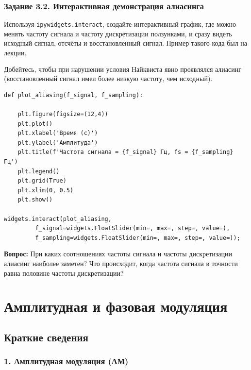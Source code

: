 \documentclass[12pt,a4paper,openany]{book}
\begin{document}
\subsection*{Задание 3.2. Интерактивная демонстрация алиасинга}

Используя \texttt{ipywidgets.\allowbreak{}interact}, создайте интерактивный график, где можно менять частоту сигнала и частоту дискретизации ползунками, и сразу видеть исходный сигнал, отсчёты и восстановленный сигнал. Пример такого кода был на лекции.

Добейтесь, чтобы при нарушении условия Найквиста явно проявлялся алиасинг (восстановленный сигнал имел более низкую частоту, чем исходный).

\begin{Verbatim}[fontsize=\small, breaklines, breakanywhere, frame=single, framesep=2mm]
def plot_aliasing(f_signal, f_sampling):

    plt.figure(figsize=(12,4))
    plt.plot()
    plt.xlabel('Время (с)')
    plt.ylabel('Амплитуда')
    plt.title(f'Частота сигнала = {f_signal} Гц, fs = {f_sampling} Гц')
    plt.legend()
    plt.grid(True)
    plt.xlim(0, 0.5)
    plt.show()

widgets.interact(plot_aliasing,
         f_signal=widgets.FloatSlider(min=, max=, step=, value=),
         f_sampling=widgets.FloatSlider(min=, max=, step=, value=));
\end{Verbatim}

\textbf{Вопрос:} При каких соотношениях частоты сигнала и частоты дискретизации алиасинг наиболее заметен? Что происходит, когда частота сигнала в точности равна половине частоты дискретизации?


\chapter{Амплитудная и фазовая модуляция}

\section*{Краткие сведения}

\subsection*{1. Амплитудная модуляция (АМ)}
\end{document}
